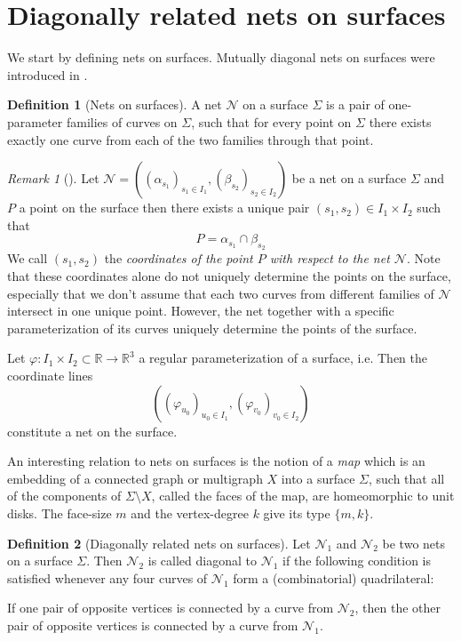 \documentclass[12pt,a4paper]{article}
\theoremstyle{definition}
\newtheorem{definition}{Definition}[section]
\theoremstyle{remark}
\newtheorem*{remark}{Remark}
\begin{document}
\section{Diagonally related nets on surfaces}
We start by defining nets on surfaces. Mutually diagonal nets on surfaces were introduced in \cite{MutuallyDiagonalNets2019}.

\begin{definition}[Nets on surfaces]
\label{def:nets-on-surfaces}
A net $\mathcal{N}$ on a surface $\Sigma$ is a pair of one-parameter families of curves on $\Sigma$, such that for every point on $\Sigma$ there exists exactly one curve from each of the two families through that point.
\end{definition}

\begin{remark}[]
\label{rm:label}
Let $\mathcal{N} = \left( (\alpha_{s_{1}})_{s_{1} \in I_1}, (\beta_{s_{2}})_{s_{2} \in I_2} \right)$ be a net on a surface
$\Sigma$ and $P$ a point on the surface then there exists a unique pair $(s_{1}, s_{2}) \in I_{1}\times I_{2}$ such that
\[
    P = \alpha_{s_1} \cap \beta_{s_2}
\]
We call $(s_1, s_2)$ the \textit{coordinates of the point $P$ with respect to the net $\mathcal{N}$}. Note that these coordinates alone do not uniquely determine the points on the surface, especially that we don't assume that each two curves from different families of $\mathcal{N}$ intersect in one unique point. However, the net together with a specific parameterization of its curves uniquely determine the points of the surface.
\end{remark}

\begin{example}
\label{ex:nets-on-surfaces}
Let $\varphi : I_{1} \times I_{2} \subset \mathbb{R} \to \mathbb{R}^3$ a regular parameterization of a surface, i.e.
Then the coordinate lines
\[
    \left( (\varphi_{u_0})_{u_{0} \in I_1}, (\varphi_{v_0})_{v_{0} \in I_2}  \right)
\]
constitute a net on the surface.

\end{example}
An interesting relation to nets on surfaces is the notion of a \textit{map} \cite{} which is an embedding of a connected
graph or multigraph $X$ into a surface $\Sigma$, such that all of the components of $\Sigma \setminus X$, called
the faces of the map, are homeomorphic to unit disks. The face-size $m$ and the vertex-degree $k$ give its type $\{m, k\}$.

\begin{definition}[Diagonally related nets on surfaces]
\label{def:diag-nets-on-surfaces}
Let $\mathcal{N}_{1}$ and $\mathcal{N}_{2}$ be two nets on a surface $\Sigma$. Then $\mathcal{N}_{2}$ is called diagonal
to $\mathcal{N}_{1}$ if the following condition is satisfied whenever any four curves of $\mathcal{N}_{1}$ form a
(combinatorial) quadrilateral:\\
\begin{mybox}{}
If one pair of opposite vertices is connected by a curve from $\mathcal{N}_{2}$, then the other pair of opposite vertices is connected by a curve from $\mathcal{N}_{1}$.
\end{mybox}
\end{definition}
\end{document}
